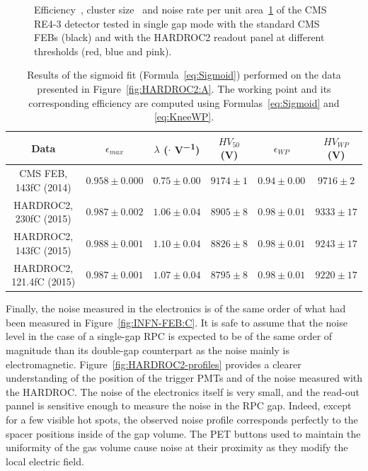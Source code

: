 \begin{figure}[H]
\begin{subfigure}{\linewidth}
			\caption{\label{fig:HARDROC2:C}}
		\end{subfigure}
		\caption{\label{fig:HARDROC2} Efficiency~, cluster size~ and noise rate per unit area~\ref{fig:HARDROC2:C} of the CMS RE4-3 detector tested in single gap mode with the standard CMS FEBs (black) and with the HARDROC2 readout panel at different thresholds (red, blue and pink).}
	\end{figure}
	
\newpage
	
	\begin{table}[H]
		\caption{\label{tab:HARDROC2} Results of the sigmoid fit (Formula~\ref{eq:Sigmoid}) performed on the data presented in Figure~\ref{fig:HARDROC2:A}. The working point and its corresponding efficiency are computed using Formulas~\ref{eq:Sigmoid} and \ref{eq:KneeWP}.}
		\footnotesize
		\begin{tabular}{|c|c|c|c|c|c|}
			\hline
			Data & $\epsilon_{max}$ & $\lambda$ ($\cdot$\Ord{-2} \si{V^{-1}}) & $HV_{50}$ (\si{V}) & $\epsilon_{WP}$ & $HV_{WP}$ (\si{V}) \\ 
			\hline
			CMS FEB, 143fC (2014) & $0.958 \pm 0.000$ & $0.75 \pm 0.00$ & $9174 \pm 1$ & $0.94 \pm 0.00$ & $9716 \pm 2$\\ 
			\hline
			HARDROC2, 230fC (2015) & $0.987 \pm 0.002$ & $1.06 \pm 0.04$ & $8905 \pm 8$ & $0.98 \pm 0.01$ & $9333 \pm 17$\\ 
			\hline
			HARDROC2, 143fC (2015) & $0.988 \pm 0.001$ & $1.10 \pm 0.04$ & $8826 \pm 8$ & $0.98 \pm 0.01$ & $9243 \pm 17$\\ 
			\hline
			HARDROC2, 121.4fC (2015) & $0.987 \pm 0.001$ & $1.07 \pm 0.04$ & $8795 \pm 8$ & $0.98 \pm 0.01$ & $9220 \pm 17$\\ 
			\hline
		\end{tabular}
	\end{table}
	
	Finally, the noise measured in the electronics is of the same order of what had been measured in Figure~\ref{fig:INFN-FEB:C}. It is safe to assume that the noise level in the case of a single-gap RPC is expected to be of the same order of magnitude than its double-gap counterpart as the noise mainly is electromagnetic. Figure~\ref{fig:HARDROC2-profiles} provides a clearer understanding of the position of the trigger PMTs and of the noise measured with the HARDROC. The noise of the electronics itself is very small, and the read-out pannel is sensitive enough to measure the noise in the RPC gap. Indeed, except for a few visible hot spots, the observed noise profile corresponds perfectly to the spacer positions inside of the gap volume. The PET buttons used to maintain the uniformity of the gas volume cause noise at their proximity as they modify the local electric field.
	 
